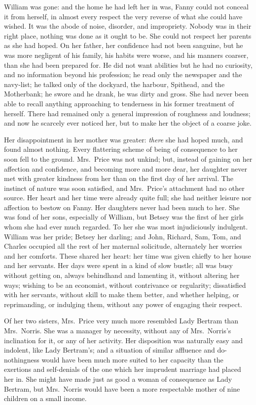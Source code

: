 William was gone:  and the home he had left her in was,
Fanny could not conceal it from herself, in almost every
respect the very reverse of what she could have wished.
It was the abode of noise, disorder, and impropriety.
Nobody was in their right place, nothing was done as it ought
to be.  She could not respect her parents as she had hoped.
On her father, her confidence had not been sanguine, but he
was more negligent of his family, his habits were worse,
and his manners coarser, than she had been prepared for.
He did not want abilities but he had no curiosity,
and no information beyond his profession; he read only
the newspaper and the navy-list; he talked only of
the dockyard, the harbour, Spithead, and the Motherbank;
he swore and he drank, he was dirty and gross.
She had never been able to recall anything approaching
to tenderness in his former treatment of herself.
There had remained only a general impression of roughness
and loudness; and now he scarcely ever noticed her,
but to make her the object of a coarse joke.

Her disappointment in her mother was greater:
\emph{there} she had hoped much, and found almost nothing.
Every flattering scheme of being of consequence to her
soon fell to the ground.  Mrs.\ Price was not unkind;
but, instead of gaining on her affection and confidence,
and becoming more and more dear, her daughter never met
with greater kindness from her than on the first day of
her arrival.  The instinct of nature was soon satisfied,
and Mrs.\ Price's attachment had no other source.
Her heart and her time were already quite full;
she had neither leisure nor affection to bestow on Fanny.
Her daughters never had been much to her.  She was fond
of her sons, especially of William, but Betsey was the first
of her girls whom she had ever much regarded.  To her she
was most injudiciously indulgent.  William was her pride;
Betsey her darling; and John, Richard, Sam, Tom, and Charles
occupied all the rest of her maternal solicitude, alternately
her worries and her comforts.  These shared her heart:
her time was given chiefly to her house and her servants.
Her days were spent in a kind of slow bustle; all was busy
without getting on, always behindhand and lamenting it,
without altering her ways; wishing to be an economist,
without contrivance or regularity; dissatisfied with
her servants, without skill to make them better,
and whether helping, or reprimanding, or indulging them,
without any power of engaging their respect.

Of her two sisters, Mrs.\ Price very much more resembled Lady
Bertram than Mrs.\ Norris.  She was a manager by necessity,
without any of Mrs.\ Norris's inclination for it, or any
of her activity.  Her disposition was naturally easy
and indolent, like Lady Bertram's; and a situation of similar
affluence and do-nothingness would have been much more
suited to her capacity than the exertions and self-denials
of the one which her imprudent marriage had placed her in.
She might have made just as good a woman of consequence
as Lady Bertram, but Mrs.\ Norris would have been a more
respectable mother of nine children on a small income.

